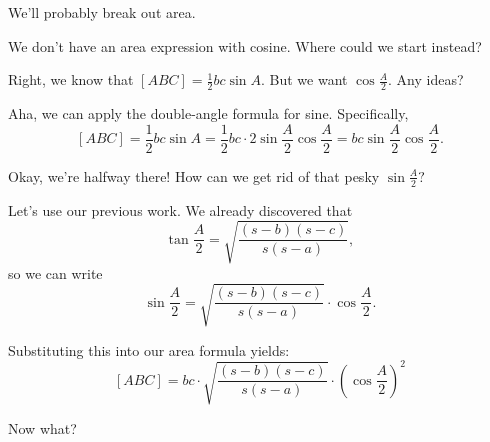 


We'll probably break out area.

We don't have an area expression with cosine.  Where could we start instead?


Right, we know that $[ABC] = \frac{1}{2}bc\sin{A}.$ But we want $\cos \frac{A}{2}.$ Any ideas?



Aha, we can apply the double-angle formula for sine. Specifically, $$[ABC] = \frac{1}{2}bc \sin A = \frac{1}{2}bc \cdot 2 \sin \frac{A}{2} \cos \frac{A}{2} = bc \sin \frac{A}{2} \cos \frac{A}{2}.$$

Okay, we're halfway there! How can we get rid of that pesky $\displaystyle \sin \frac{A}{2} ?$


Let's use our previous work. We already discovered that
$$\tan\frac{A}{2} = \sqrt{\frac{(s-b)(s-c)}{s(s-a)}},$$
so we can write
$$\sin\frac{A}{2} = \sqrt{\frac{(s-b)(s-c)}{s(s-a)}}\cdot \cos\frac{A}{2}.$$

Substituting this into our area formula yields: $$[ABC] = bc \cdot \sqrt{\frac{(s-b)(s-c)}{ s(s-a)}} \cdot \left(\cos\frac{A}{2}\right)^2$$

Now what?


